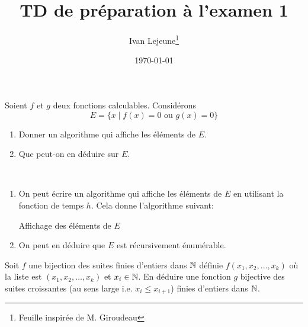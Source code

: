 \documentclass[french,a4paper,10pt]{article}
\title{\color{astral} \sffamily \bfseries TD de préparation à l'examen 1}
\author{Ivan Lejeune\thanks{Feuille inspirée de M. Giroudeau}}
\date{\today}
\begin{document}
	
	\maketitle
	
	\begin{td-exo}[1]
		Soient $f$ et $g$ deux fonctions calculables. Considérons
        \[
            E=\{x\mid f(x)=0\text{ ou }g(x)=0\}
        \]
        \begin{enumerate}
            \item Donner un algorithme qui affiche les éléments de $E$.
            \item Que peut-on en déduire sur $E$.
        \end{enumerate}
	\end{td-exo}

    \begin{td-sol}\,
        \begin{enumerate}
            \item On peut écrire un algorithme qui affiche les éléments de $E$ en utilisant la
            fonction de temps $h$. Cela donne l'algorithme suivant:\\
                \begin{algorithm}[H]
                    \caption{Affichage des éléments de $E$}
                \end{algorithm}
            \item On peut en déduire que $E$ est récursivement énumérable.
        \end{enumerate}
    \end{td-sol}

    \begin{td-exo}[2]
        Soit $f$ une bijection des suites finies d'entiers dans $\mathbb{N}$ définie 
        $f(x_1,x_2,\dots,x_k)$ où la liste est $(x_1,x_2,\dots,x_k)$ et $x_i\in\mathbb{N}$.
        En déduire une fonction $g$ bijective des suites croissantes (au sens large
        i.e. $x_i\leq x_{i+1}$) finies d'entiers dans $\mathbb{N}$.
    \end{td-exo}
	
\end{document}
